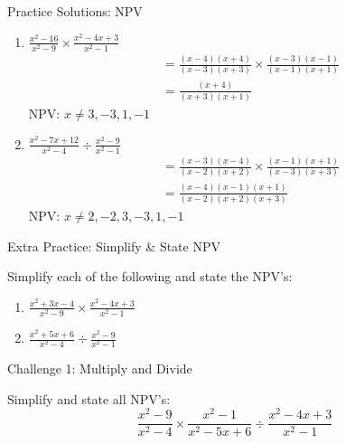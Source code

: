 \documentclass[aspectratio=169]{beamer}
\begin{document}
\begin{frame}{Practice Solutions: NPV}
\begin{tcolorbox}[colback=lightgray,colframe=accent,title=Detailed Solutions]
\footnotesize
\begin{enumerate}
  \item $\frac{x^2 - 16}{x^2 - 9} \times \frac{x^2 - 4x + 3}{x^2 - 1}$
  \begin{align*}
    &= \frac{(x-4)(x+4)}{(x-3)(x+3)} \times \frac{(x-3)(x-1)}{(x-1)(x+1)} \\
    &= \frac{(x+4)}{(x+3)(x+1)}
  \end{align*}
  NPV: $x \neq 3, -3, 1, -1$

  \item $\frac{x^2 - 7x + 12}{x^2 - 4} \div \frac{x^2 - 9}{x^2 - 1}$
  \begin{align*}
    &= \frac{(x-3)(x-4)}{(x-2)(x+2)} \times \frac{(x-1)(x+1)}{(x-3)(x+3)} \\
    &= \frac{(x-4)(x-1)(x+1)}{(x-2)(x+2)(x+3)}
  \end{align*}
  NPV: $x \neq 2, -2, 3, -3, 1, -1$
\end{enumerate}
\end{tcolorbox}
\end{frame}

\begin{frame}{Extra Practice: Simplify & State NPV}
\begin{tcolorbox}[colback=lightgray,colframe=primary,title=Extra Practice]
\footnotesize
Simplify each of the following and state the NPV's:
\begin{enumerate}
  \item $\frac{x^2 + 3x - 4}{x^2 - 9} \times \frac{x^2 - 4x + 3}{x^2 - 1}$
  \item $\frac{x^2 + 5x + 6}{x^2 - 4} \div \frac{x^2 - 9}{x^2 - 1}$
\end{enumerate}
\end{tcolorbox}
\end{frame}

\begin{frame}{Challenge 1: Multiply and Divide}
\begin{tcolorbox}[colback=lightgray,colframe=primary,title=Challenge 1]
\footnotesize
Simplify and state all NPV's:
\[
\frac{x^2-9}{x^2-4} \times \frac{x^2-1}{x^2-5x+6} \div \frac{x^2-4x+3}{x^2-1}
\]
\end{tcolorbox}
\end{frame}
\end{document}
